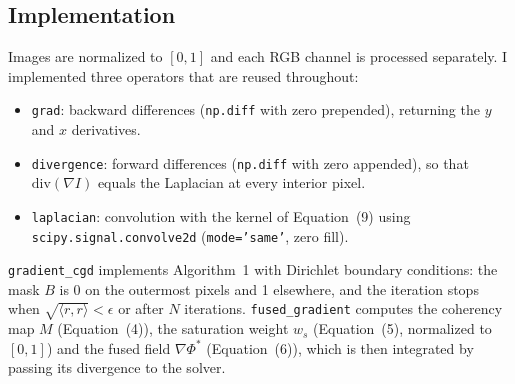 \documentclass[11pt]{article}
\begin{document}
\subsection*{Implementation}
Images are normalized to $[0,1]$ and each RGB channel is processed separately. I implemented three operators that are reused throughout:
\begin{itemize}\setlength{\itemsep}{0pt}
\item \texttt{grad}: backward differences (\texttt{np.diff} with zero prepended), returning the $y$ and $x$ derivatives.
\item \texttt{divergence}: forward differences (\texttt{np.diff} with zero appended), so that $\mathrm{div}(\nabla I)$ equals the Laplacian at every interior pixel.
\item \texttt{laplacian}: convolution with the kernel of Equation~(9) using \texttt{scipy.signal.convolve2d} (\texttt{mode='same'}, zero fill).
\end{itemize}
\texttt{gradient\_cgd} implements Algorithm~1 with Dirichlet boundary conditions: the mask $B$ is 0 on the outermost pixels and 1 elsewhere, and the iteration stops when $\sqrt{\langle r,r\rangle}<\epsilon$ or after $N$ iterations. \texttt{fused\_gradient} computes the coherency map $M$ (Equation~(4)), the saturation weight $w_s$ (Equation~(5), normalized to $[0,1]$) and the fused field $\nabla\Phi^*$ (Equation~(6)), which is then integrated by passing its divergence to the solver.
\end{document}
